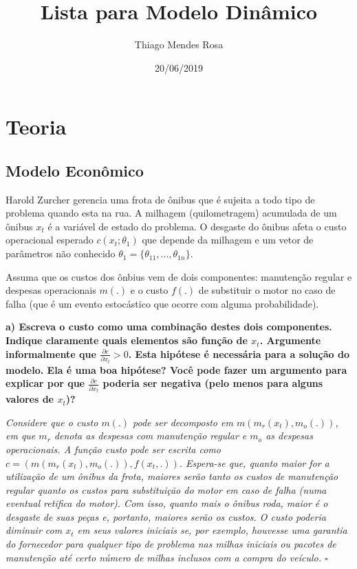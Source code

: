 \documentclass[12pt,a4paper]{article}
\title{Lista para Modelo Dinâmico}
\author{Thiago Mendes Rosa}
\date{20/06/2019}
\begin{document}
\maketitle

\hypertarget{teoria}{%
\section{Teoria}\label{teoria}}

\hypertarget{modelo-economico}{%
\subsection{Modelo Econômico}\label{modelo-economico}}

Harold Zurcher gerencia uma frota de ônibus que é sujeita a todo tipo de
problema quando esta na rua. A milhagem (quilometragem) acumulada de um
ônibus \(x_t\) é a variável de estado do problema. O desgaste do ônibus
afeta o custo operacional esperado \(c(x_t; \theta_1)\) que depende da
milhagem e um vetor de parâmetros não conhecido
\(\theta_1 = \{\theta_{11}, . . . , \theta_{1n}\}\).

Assuma que os custos dos ônbius vem de dois componentes: manutenção
regular e despesas operacionais \(m(.)\) e o custo \(f(.)\) de
substituir o motor no caso de falha (que é um evento estocástico que
ocorre com alguma probabilidade).

\textbf{a) Escreva o custo como uma combinação destes dois componentes.
Indique claramente quais elementos são função de \(x_t\). Argumente
informalmente que \(\frac{\partial c}{\partial x_t} > 0\). Esta hipótese
é necessária para a solução do modelo. Ela é uma boa hipótese? Você pode
fazer um argumento para explicar por que
\(\frac{\partial c}{\partial x_t}\) poderia ser negativa (pelo menos
para alguns valores de \(x_t\))?}

\emph{Considere que o custo \(m(.)\) pode ser decomposto em
\(m(m_r(x_t),m_o(.))\), em que \(m_r\) denota as despesas com manutenção
regular e \(m_o\) as despesas operacionais. A função custo pode ser
escrita como \(c=(m(m_r(x_t),m_o(.)),f(x_t,.))\). Espera-se que, quanto
maior for a utilização de um ônibus da frota, maiores serão tanto os
custos de manutenção regular quanto os custos para substituição do motor
em caso de falha (numa eventual retifica do motor). Com isso, quanto
mais o ônibus roda, maior é o desgaste de suas peças e, portanto,
maiores serão os custos. O custo poderia diminuir com \(x_t\) em seus
valores iniciais se, por exemplo, houvesse uma garantia do fornecedor
para qualquer tipo de problema nas milhas iniciais ou pacotes de
manutenção até certo número de milhas inclusos com a compra do veículo.
\(\square\)}
\end{document}
